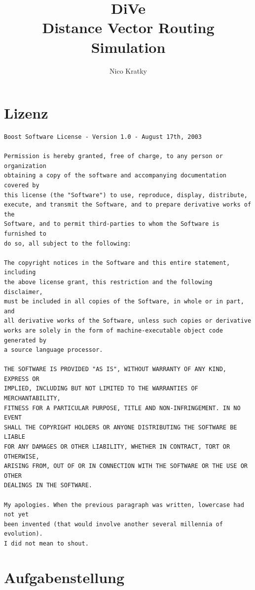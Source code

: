 \documentclass[a4paper,ngerman]{article}
\title{%
    DiVe \\
    Distance Vector Routing Simulation
}
\author{Nico Kratky}
\begin{document}
\begin{titlepage}
\maketitle
\end{titlepage}

\tableofcontents
\clearpage

\section{Lizenz}
\begin{Verbatim}[fontsize=\small]
Boost Software License - Version 1.0 - August 17th, 2003

Permission is hereby granted, free of charge, to any person or organization
obtaining a copy of the software and accompanying documentation covered by
this license (the "Software") to use, reproduce, display, distribute,
execute, and transmit the Software, and to prepare derivative works of the
Software, and to permit third-parties to whom the Software is furnished to
do so, all subject to the following:

The copyright notices in the Software and this entire statement, including
the above license grant, this restriction and the following disclaimer,
must be included in all copies of the Software, in whole or in part, and
all derivative works of the Software, unless such copies or derivative
works are solely in the form of machine-executable object code generated by
a source language processor.

THE SOFTWARE IS PROVIDED "AS IS", WITHOUT WARRANTY OF ANY KIND, EXPRESS OR
IMPLIED, INCLUDING BUT NOT LIMITED TO THE WARRANTIES OF MERCHANTABILITY,
FITNESS FOR A PARTICULAR PURPOSE, TITLE AND NON-INFRINGEMENT. IN NO EVENT
SHALL THE COPYRIGHT HOLDERS OR ANYONE DISTRIBUTING THE SOFTWARE BE LIABLE
FOR ANY DAMAGES OR OTHER LIABILITY, WHETHER IN CONTRACT, TORT OR OTHERWISE,
ARISING FROM, OUT OF OR IN CONNECTION WITH THE SOFTWARE OR THE USE OR OTHER
DEALINGS IN THE SOFTWARE.

My apologies. When the previous paragraph was written, lowercase had not yet
been invented (that would involve another several millennia of evolution).
I did not mean to shout.
\end{Verbatim}
\clearpage

\section{Aufgabenstellung}
\end{document}

